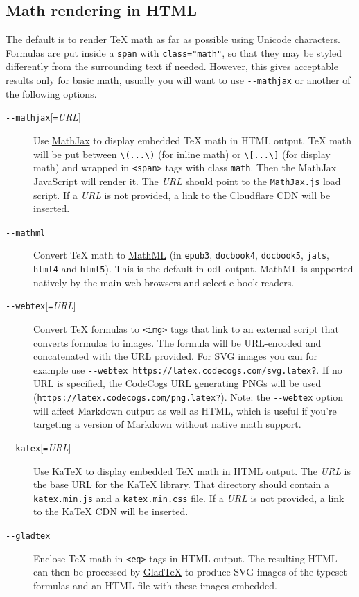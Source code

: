 \documentclass[
]{article}
\begin{document}
\hypertarget{math-rendering-in-html}{%
\subsection{Math rendering in HTML}\label{math-rendering-in-html}}

The default is to render TeX math as far as possible using Unicode
characters. Formulas are put inside a \texttt{span} with
\texttt{class="math"}, so that they may be styled differently from the
surrounding text if needed. However, this gives acceptable results only
for basic math, usually you will want to use \texttt{-\/-mathjax} or
another of the following options.

\begin{description}
\item[\texttt{-\/-mathjax}{[}\texttt{=}\emph{URL}{]}]
Use \href{https://www.mathjax.org}{MathJax} to display embedded TeX math
in HTML output. TeX math will be put between
\texttt{\textbackslash{}(...\textbackslash{})} (for inline math) or
\texttt{\textbackslash{}{[}...\textbackslash{}{]}} (for display math)
and wrapped in \texttt{\textless{}span\textgreater{}} tags with class
\texttt{math}. Then the MathJax JavaScript will render it. The
\emph{URL} should point to the \texttt{MathJax.js} load script. If a
\emph{URL} is not provided, a link to the Cloudflare CDN will be
inserted.
\item[\texttt{-\/-mathml}]
Convert TeX math to \href{https://www.w3.org/Math/}{MathML} (in
\texttt{epub3}, \texttt{docbook4}, \texttt{docbook5}, \texttt{jats},
\texttt{html4} and \texttt{html5}). This is the default in \texttt{odt}
output. MathML is supported natively by the main web browsers and select
e-book readers.
\item[\texttt{-\/-webtex}{[}\texttt{=}\emph{URL}{]}]
Convert TeX formulas to \texttt{\textless{}img\textgreater{}} tags that
link to an external script that converts formulas to images. The formula
will be URL-encoded and concatenated with the URL provided. For SVG
images you can for example use
\texttt{-\/-webtex\ https://latex.codecogs.com/svg.latex?}. If no URL is
specified, the CodeCogs URL generating PNGs will be used
(\texttt{https://latex.codecogs.com/png.latex?}). Note: the
\texttt{-\/-webtex} option will affect Markdown output as well as HTML,
which is useful if you're targeting a version of Markdown without native
math support.
\item[\texttt{-\/-katex}{[}\texttt{=}\emph{URL}{]}]
Use \href{https://github.com/Khan/KaTeX}{KaTeX} to display embedded TeX
math in HTML output. The \emph{URL} is the base URL for the KaTeX
library. That directory should contain a \texttt{katex.min.js} and a
\texttt{katex.min.css} file. If a \emph{URL} is not provided, a link to
the KaTeX CDN will be inserted.
\item[\texttt{-\/-gladtex}]
Enclose TeX math in \texttt{\textless{}eq\textgreater{}} tags in HTML
output. The resulting HTML can then be processed by
\href{https://humenda.github.io/GladTeX/}{GladTeX} to produce SVG images
of the typeset formulas and an HTML file with these images embedded.


\end{description}
\end{document}
